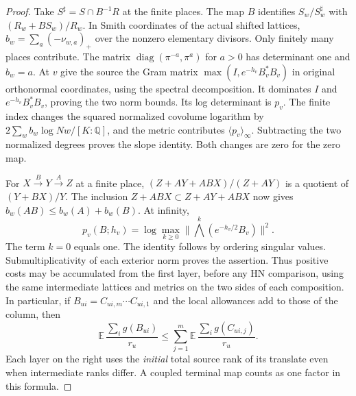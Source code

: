 \begin{proof}
Take \(S^\sharp=S\cap B^{-1}R\) at the finite places. The map \(B\)
identifies \(S_w/S_w^\sharp\) with \((R_w+BS_w)/R_w\).
In Smith coordinates of the actual shifted lattices,
\(b_w=\sum_a(-\nu_{w,a})_+\) over the nonzero elementary divisors.
Only finitely many places contribute. The matrix
\(\operatorname{diag}(\pi^{-a},\pi^a)\) for \(a>0\) has determinant
one and \(b_w=a\). At \(v\) give the source the Gram matrix
\(\max(I,e^{-h_v}B_v^*B_v)\) in original orthonormal coordinates,
using the spectral decomposition. It dominates \(I\) and
\(e^{-h_v}B_v^*B_v\), proving the two norm bounds. Its log determinant
is \(p_v\). The finite index changes the squared normalized
covolume logarithm by \(2\sum_w b_w\log Nw/[K:\mathbb Q]\), and
the metric contributes \(\langle p_v\rangle_\infty\). Subtracting
the two normalized degrees proves the slope identity. Both changes
are zero for the zero map.

For \(X\xrightarrow{B}Y\xrightarrow{A}Z\) at a finite place,
\((Z+AY+ABX)/(Z+AY)\) is a quotient of \((Y+BX)/Y\).
The inclusion \(Z+ABX\subset Z+AY+ABX\) now gives
\(b_w(AB)\le b_w(A)+b_w(B)\). At infinity,
\[
 p_v(B;h_v)=\log\max_{k\ge0}
                 \|\textstyle\bigwedge^k(e^{-h_v/2}B_v)\|^2 .
\]
The term \(k=0\) equals one. The identity follows by ordering singular
values. Submultiplicativity of each exterior norm proves the assertion.
Thus positive costs may be accumulated from the first layer, before any
HN comparison, using the same intermediate lattices and metrics on the
two sides of each composition. In particular, if
\(B_{ui}=C_{ui,m}\cdots C_{ui,1}\) and the local allowances add to
those of the column, then
\[
 \mathbb E\,\frac{\sum_i g(B_{ui})}{r_u}
 \le \sum_{j=1}^m\mathbb E\,\frac{\sum_i g(C_{ui,j})}{r_u}.
\]
Each layer on the right uses the \emph{initial} total source rank
of its translate even when intermediate ranks differ. A coupled
terminal map counts as one factor in this formula.
\end{proof}

